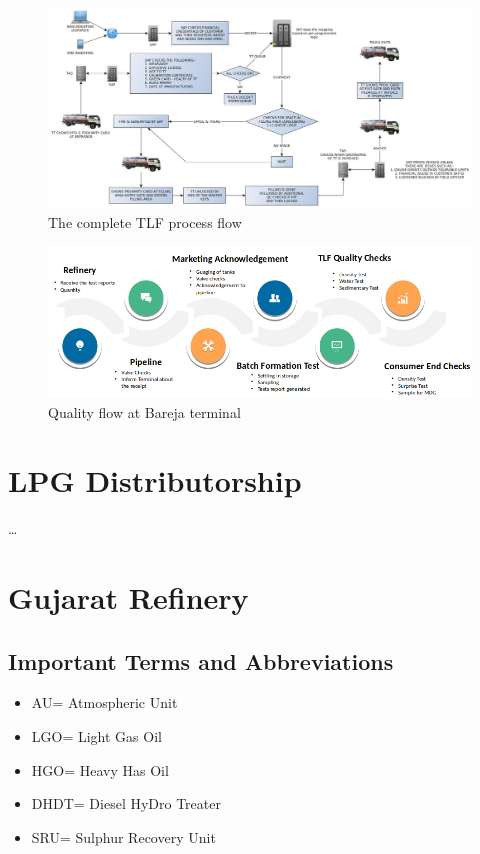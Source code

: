 \documentclass{report}
\begin{document}
	\pagebreak
	\begin{landscape}
		\begin{figure}[h]
			\centering
			\includegraphics[width=\linewidth]{distribution_flow}
			\caption{The complete TLF process flow}
			\label{distribution_flow}
		\end{figure}
	\end{landscape}
	\pagebreak
	\begin{figure}[h]
		\centering
		\includegraphics[width=\linewidth]{bareja_quality_flow}
		\caption{Quality flow at Bareja terminal}
		\label{bareja_quality_flow}
	\end{figure}
	\chapter{LPG Distributorship}
	\ldots
	\chapter{Gujarat Refinery}
	\section{Important Terms and Abbreviations}
	\begin{itemize}
		\item AU= Atmospheric Unit
		\item LGO= Light Gas Oil
		\item HGO= Heavy Has Oil
		\item DHDT= Diesel HyDro Treater
		\item SRU= Sulphur Recovery Unit
	\end{itemize}
\end{document}
